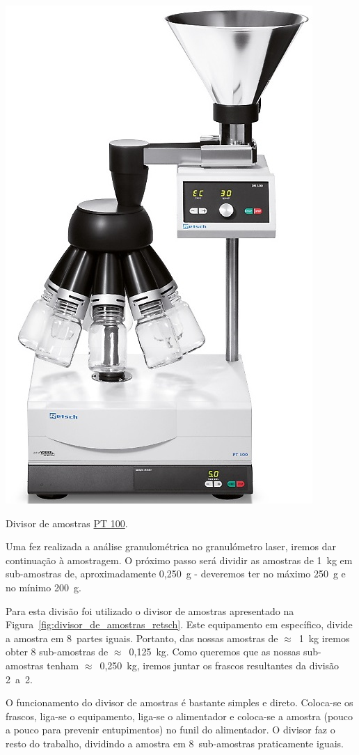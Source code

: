 \begin{marginfigure}[3\baselineskip]
    \centering
    \includegraphics[width=0.55\linewidth]{figures/divisor_de_amostras_retsch}
    \caption{Divisor de amostras \href{https://www.retsch.pt/pt/produtos/assistencia/amostradores/pt-100/}{PT 100}.}
    \label{fig:divisor_de_amostras_retsch}
\end{marginfigure}

Uma fez realizada a análise granulométrica no granulómetro laser, iremos dar continuação à amostragem.
O próximo passo será dividir as amostras de 1~kg em sub-amostras de, aproximadamente 0,250~g - deveremos ter no máximo 250~g e no mínimo 200~g.

Para esta divisão foi utilizado o divisor de amostras apresentado na Figura~\ref{fig:divisor_de_amostras_retsch}.
Este equipamento em específico, divide a amostra em 8~partes iguais.
Portanto, das nossas amostras de $\approx$~1~kg iremos obter 8 sub-amostras de $\approx$~0,125~kg.
Como queremos que as nossas sub-amostras tenham $\approx$~0,250~kg, iremos juntar os frascos resultantes da divisão 2~a~2.



O funcionamento do divisor de amostras é bastante simples e direto.
Coloca-se os frascos, liga-se o equipamento, liga-se o alimentador e coloca-se a amostra (pouco a pouco para prevenir entupimentos) no funil do alimentador.
O divisor faz o resto do trabalho, dividindo a amostra em 8~sub-amostras praticamente iguais.

